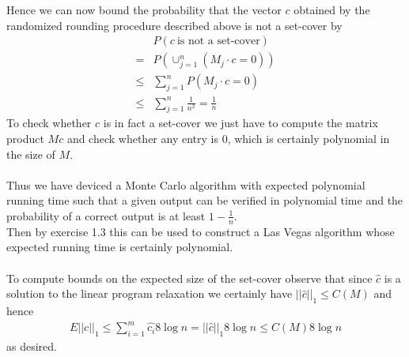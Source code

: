 Hence we can now bound the probability that the vector $c$ obtained by the randomized rounding procedure described above
is not a set-cover by
\begin{align*}
	&P\left( c \ \text{is not a set-cover} \right) \\
	=&P\left( \cup_{j=1}^n \left( M_j \cdot c=0 \right) \right) \\
	\leq& \sum_{j=1}^{n}P\left( M_j \cdot c=0 \right) \\
	\leq &\sum_{j=1}^{n} \frac{1}{n^2} =\frac{1}{n}
\end{align*}
To check whether $c$ is in fact a set-cover we just have to compute the matrix product $Mc$
and check whether any entry is $0$, which is certainly polynomial in the size of $M$. \\ \\
Thus we have deviced a Monte Carlo algorithm with expected polynomial running time
such that a given output can be verified in polynomial time and the probability of a correct output is at least
$1-\frac{1}{n}$. \\
Then by exercise 1.3 this can be used to construct a Las Vegas algorithm whose expected running time is certainly polynomial. \\ \\
To compute bounds on the expected size of the set-cover observe that since
$\widehat{c}$ is a solution to the linear program relaxation we certainly have
$||\widehat{c}||_1 \leq C(M)$ and hence
\begin{align*}
	E||c||_1 \leq \sum_{i=1}^{m} \widehat{c_i}8 \log n = ||\widehat{c}||_1 8 \log n \leq C(M) 8 \log n
\end{align*}
as desired.
